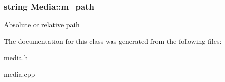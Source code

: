 \subsubsection[{\texorpdfstring{m\+\_\+path}{m_path}}]{\setlength{\rightskip}{0pt plus 5cm}string Media\+::m\+\_\+path\hspace{0.3cm}{\ttfamily [protected]}}\hypertarget{classMedia_abc2766c1b082546de88bff34e60f5809}{}\label{classMedia_abc2766c1b082546de88bff34e60f5809}
Absolute or relative path 

The documentation for this class was generated from the following files\+:\begin{DoxyCompactItemize}
\item 
media.\+h\item 
media.\+cpp\end{DoxyCompactItemize}
